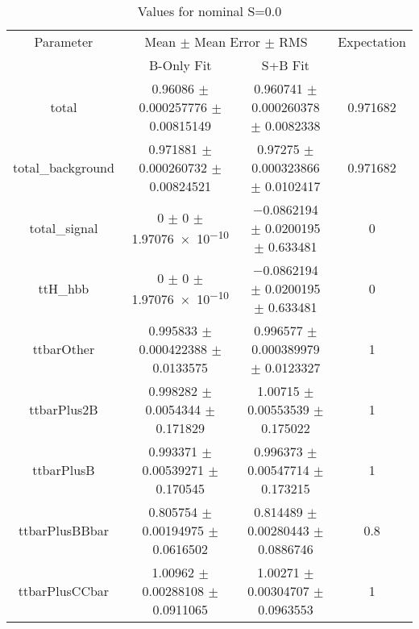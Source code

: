 \begin{table}
\centering
\caption{Values for nominal S=0.0}
\begin{tabular}{cccc}
\toprule
Parameter & \multicolumn{2}{c}{Mean $\pm$ Mean Error $\pm$ RMS} & Expectation\\
 & B-Only Fit & S+B Fit & \\
\midrule
total & \num{0.96086} $\pm$ \num{0.000257776} $\pm$ \num{0.00815149} & \num{0.960741} $\pm$ \num{0.000260378} $\pm$ \num{0.0082338} & \num{0.971682}\\
total\_background & \num{0.971881} $\pm$ \num{0.000260732} $\pm$ \num{0.00824521} & \num{0.97275} $\pm$ \num{0.000323866} $\pm$ \num{0.0102417} & \num{0.971682}\\
total\_signal & \num{0} $\pm$ \num{0} $\pm$ \num{1.97076e-10} & \num{-0.0862194} $\pm$ \num{0.0200195} $\pm$ \num{0.633481} & \num{0}\\
ttH\_hbb & \num{0} $\pm$ \num{0} $\pm$ \num{1.97076e-10} & \num{-0.0862194} $\pm$ \num{0.0200195} $\pm$ \num{0.633481} & \num{0}\\
ttbarOther & \num{0.995833} $\pm$ \num{0.000422388} $\pm$ \num{0.0133575} & \num{0.996577} $\pm$ \num{0.000389979} $\pm$ \num{0.0123327} & \num{1}\\
ttbarPlus2B & \num{0.998282} $\pm$ \num{0.0054344} $\pm$ \num{0.171829} & \num{1.00715} $\pm$ \num{0.00553539} $\pm$ \num{0.175022} & \num{1}\\
ttbarPlusB & \num{0.993371} $\pm$ \num{0.00539271} $\pm$ \num{0.170545} & \num{0.996373} $\pm$ \num{0.00547714} $\pm$ \num{0.173215} & \num{1}\\
ttbarPlusBBbar & \num{0.805754} $\pm$ \num{0.00194975} $\pm$ \num{0.0616502} & \num{0.814489} $\pm$ \num{0.00280443} $\pm$ \num{0.0886746} & \num{0.8}\\
ttbarPlusCCbar & \num{1.00962} $\pm$ \num{0.00288108} $\pm$ \num{0.0911065} & \num{1.00271} $\pm$ \num{0.00304707} $\pm$ \num{0.0963553} & \num{1}\\
\bottomrule
\end{tabular}
\end{table}